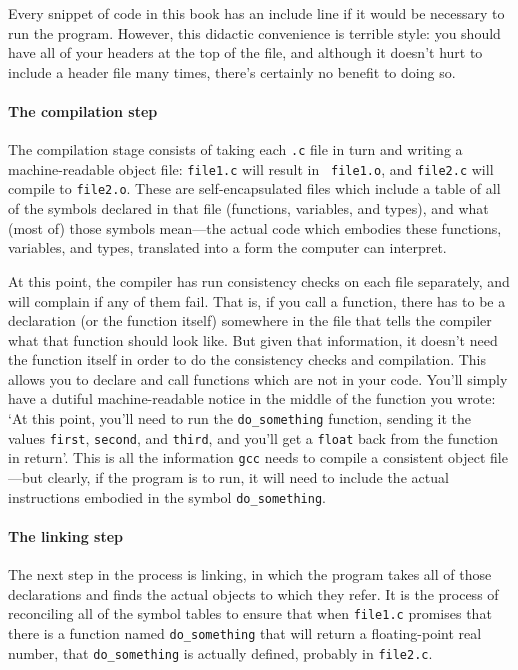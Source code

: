 \documentclass[12pt]{article}
\def\ind#1{\index{#1}#1}
\begin{document}
Every snippet of code in this book has an include line if it would be
necessary to run the program.  However, this didactic convenience is
terrible style: you should have all of your headers at the top of the
file, and although it doesn't hurt to include a header file many times,
there's certainly no benefit to doing so.


\paragraph{The compilation step} 
The \ind{compilation}
stage consists of taking each {\tt .c} file in turn and writing
a machine-readable object file: {\tt file1.c} will result in {\tt
file1.o}, and {\tt file2.c} will compile to {\tt file2.o}. These  are
self-encapsulated files which include a table of all of the symbols
declared in that file (functions, variables, and types), and what (most of) those
symbols mean---the actual code which embodies these functions, variables,
and types, translated into a form the computer can interpret.

At this point, the compiler has run consistency checks on each file separately,
and will complain if any of them fail. That is, if you call a function,
there has to be a declaration (or the function itself) somewhere in the
file that tells the compiler what that function should look like. But 
given that information, it doesn't need the function itself in order to
do the consistency checks and compilation. This allows you to declare
and call functions which are not in your code. You'll simply have a
dutiful machine-readable notice in the middle of the function you wrote:
`At this point, you'll need to run the {\tt do\_something} function,
sending it the values {\tt first}, {\tt second}, and {\tt third}, and
you'll get a {\tt float} back from the function in return'. This is
all the information {\tt gcc} needs to compile a consistent object file---but
clearly, if the program is to run, it will need to include the actual
instructions embodied in the symbol {\tt do\_something}.

\paragraph{The \ind{linking} step}
The next step in the process is linking, in which the program takes all
of those declarations and finds the actual objects to which they refer. It
is the process of reconciling all of the symbol tables to ensure that when
{\tt file1.c} promises that there is a function named {\tt do\_something}
that will return a floating-point real number, that {\tt do\_something}
is actually defined,  probably in {\tt file2.c}.
\end{document}
